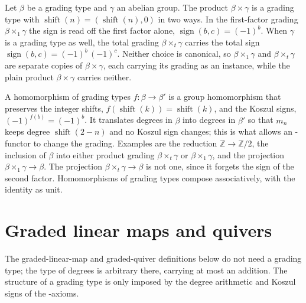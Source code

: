 \begin{definition}
\label{AInfinityTheory.Grading.prod}
\leanok
{}
Let $\beta$ be a grading type and $\gamma$ an abelian group. The product
$\beta \times \gamma$ is a grading type with
$\operatorname{shift}(n) = (\operatorname{shift}(n), 0)$ in two ways. In the
first-factor grading $\beta \times_1 \gamma$ the sign is read off the first
factor alone, $\operatorname{sign}(b,c) = (-1)^b$. When $\gamma$ is a grading
type as well, the total grading $\beta \times_t \gamma$ carries the total sign
$\operatorname{sign}(b,c) = (-1)^b\,(-1)^c$. Neither choice is canonical, so
$\beta \times_1 \gamma$ and $\beta \times_t \gamma$ are separate copies of
$\beta \times \gamma$, each carrying its grading as an instance, while the plain
product $\beta \times \gamma$ carries neither.
\end{definition}

\begin{definition}
\label{AInfinityTheory.GradingHom}
\leanok
{}
A homomorphism of grading types $f : \beta \to \beta'$ is a group homomorphism that
preserves the integer shifts, $f(\operatorname{shift}(k)) = \operatorname{shift}(k)$,
and the Koszul signs, $(-1)^{f(b)} = (-1)^b$. It translates degrees in $\beta$ into
degrees in $\beta'$ so that $m_n$ keeps degree $\operatorname{shift}(2-n)$ and no
Koszul sign changes; this is what allows an \Ainf{}-functor to change the grading.
Examples are the reduction $\mathbb{Z} \to \mathbb{Z}/2$, the inclusion of
$\beta$ into either product grading $\beta \times_t \gamma$ or
$\beta \times_1 \gamma$, and the projection $\beta \times_1 \gamma \to \beta$.
The projection $\beta \times_t \gamma \to \beta$ is not one, since it forgets the
sign of the second factor. Homomorphisms of
grading types compose associatively, with the identity as unit.
\end{definition}

\section{Graded linear maps and quivers}

The graded-linear-map and graded-quiver definitions below do not need a grading
type; the type of degrees is arbitrary there, carrying at most an addition. The
structure of a grading type is only imposed by the degree arithmetic and Koszul
signs of the \Ainf{}-axioms.

